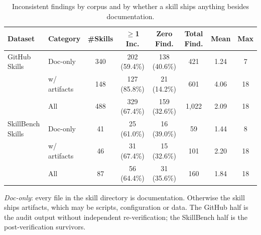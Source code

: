 \begin{table}[t]
  \centering
  \small
  \setlength{\tabcolsep}{3.2pt}
  \caption{Inconsistent findings by corpus and by whether a skill ships anything
    besides documentation.}
  \label{tab:finding_stats}
  \begin{tabular}{llcccccc}
    \toprule
    Dataset & Category & \#Skills & $\ge$1 Inc. & Zero Find. & Total Find. & Mean & Max \\
    \midrule
    GitHub Skills
      & Doc-only      & 340 & 202 (59.4\%) & 138 (40.6\%) &   421 & 1.24 &  7 \\
      & w/ artifacts  & 148 & 127 (85.8\%) &  21 (14.2\%) &   601 & 4.06 & 18 \\
      & All           & 488 & 329 (67.4\%) & 159 (32.6\%) & 1{,}022 & 2.09 & 18 \\
    \midrule
    SkillBench Skills
      & Doc-only      &  41 &  25 (61.0\%) &  16 (39.0\%) &    59 & 1.44 &  8 \\
      & w/ artifacts  &  46 &  31 (67.4\%) &  15 (32.6\%) &   101 & 2.20 & 18 \\
      & All           &  87 &  56 (64.4\%) &  31 (35.6\%) &   160 & 1.84 & 18 \\
    \bottomrule
  \end{tabular}

  \vspace{2pt}
  \begin{minipage}{\linewidth}
    \footnotesize\raggedright
    \emph{Doc-only}: every file in the skill directory is documentation.
    Otherwise the skill ships artifacts, which may be scripts, configuration or
    data. The GitHub half is the audit output without independent
    re-verification; the SkillBench half is the post-verification survivors.
  \end{minipage}
\end{table}
